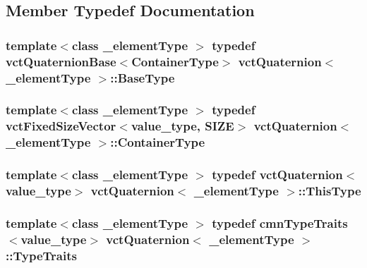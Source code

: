 \subsection{Member Typedef Documentation}
\hypertarget{classvct_quaternion_a6904ddafc9719f3ba49ffd08dc0b0702}{
\subsubsection[{Base\-Type}]{\setlength{\rightskip}{0pt plus 5cm}template$<$class \-\_\-element\-Type $>$ typedef {\bf vct\-Quaternion\-Base}$<${\bf Container\-Type}$>$ {\bf vct\-Quaternion}$<$ \-\_\-element\-Type $>$\-::{\bf Base\-Type}}}\label{classvct_quaternion_a6904ddafc9719f3ba49ffd08dc0b0702}
\hypertarget{classvct_quaternion_ac536cb4b97d3759e26fd33094a3630fa}{
\subsubsection[{Container\-Type}]{\setlength{\rightskip}{0pt plus 5cm}template$<$class \-\_\-element\-Type $>$ typedef {\bf vct\-Fixed\-Size\-Vector}$<$value\-\_\-type, {\bf S\-I\-Z\-E}$>$ {\bf vct\-Quaternion}$<$ \-\_\-element\-Type $>$\-::{\bf Container\-Type}}}\label{classvct_quaternion_ac536cb4b97d3759e26fd33094a3630fa}
\hypertarget{classvct_quaternion_a07e736b9769c53c9261fd2f4c79bf4c1}{
\subsubsection[{This\-Type}]{\setlength{\rightskip}{0pt plus 5cm}template$<$class \-\_\-element\-Type $>$ typedef {\bf vct\-Quaternion}$<$value\-\_\-type$>$ {\bf vct\-Quaternion}$<$ \-\_\-element\-Type $>$\-::{\bf This\-Type}}}\label{classvct_quaternion_a07e736b9769c53c9261fd2f4c79bf4c1}
\hypertarget{classvct_quaternion_a7a67c4eef1358c2853db271c468a1c03}{
\subsubsection[{Type\-Traits}]{\setlength{\rightskip}{0pt plus 5cm}template$<$class \-\_\-element\-Type $>$ typedef {\bf cmn\-Type\-Traits}$<$value\-\_\-type$>$ {\bf vct\-Quaternion}$<$ \-\_\-element\-Type $>$\-::{\bf Type\-Traits}}}\label{classvct_quaternion_a7a67c4eef1358c2853db271c468a1c03}


